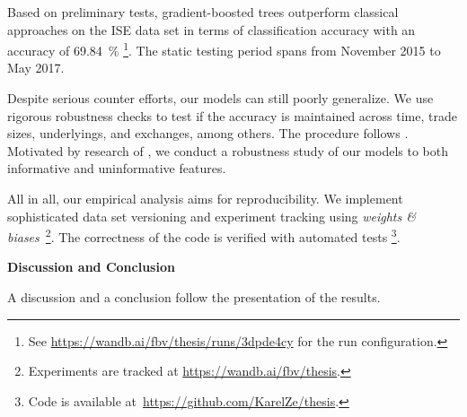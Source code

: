 Based on preliminary tests, gradient-boosted trees outperform classical approaches on the \gls{ISE} data set in terms of classification accuracy with an accuracy of 69.84~\% \footnote{See \url{https://wandb.ai/fbv/thesis/runs/3dpde4cy} for the run configuration.}. The static testing period spans from November 2015 to May 2017.


Despite serious counter efforts, our models can still poorly generalize. We use rigorous robustness checks to test if the accuracy is maintained across time, trade sizes, underlyings, and exchanges, among others. The procedure follows \textcites{chakrabartyTradeClassificationAlgorithms2012}{grauerOptionTradeClassification2022}{ronenMachineLearningTrade2022}{savickasInferringDirectionOption2003}. Motivated by research of \textcite{grinsztajnWhyTreebasedModels2022}, we conduct a robustness study of our models to both informative and uninformative features.

All in all, our empirical analysis aims for reproducibility. We implement sophisticated data set versioning and experiment tracking using \emph{weights \& biases}~\footnote{Experiments are tracked at \url{https://wandb.ai/fbv/thesis}.}. The correctness of the code is verified with automated tests \footnote{Code is available at~\url{https://github.com/KarelZe/thesis}.}. 

\textbf{Discussion and Conclusion}

A discussion and a conclusion follow the presentation of the results.



